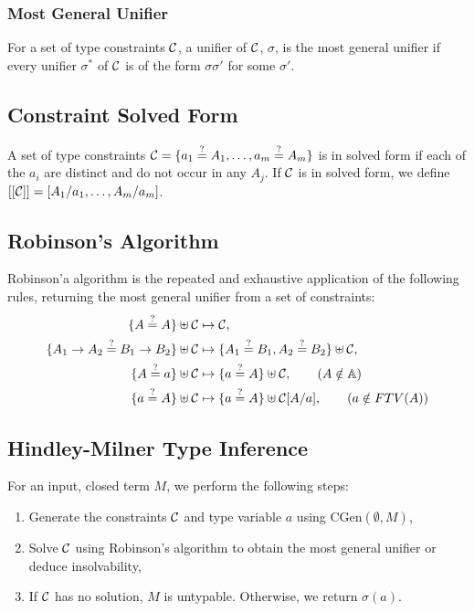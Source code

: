 \subsubsection{Most General Unifier}

For a set of type constraints $\mathcal{C}$, a unifier of $\mathcal{C}$, $\sigma$, 
is the most general unifier if every unifier $\sigma^*$ of $\mathcal{C}$ is 
of the form $\sigma\sigma'$ for some $\sigma'$.

\subsection{Constraint Solved Form}

A set of type constraints $\mc{C} = \{a_1 \teq A_1, \ldots, a_m \teq A_m\}$
is in solved form if each of the $a_i$ are distinct and do not occur
in any $A_j$. If $\mathcal{C}$ is in solved form, we define 
$[[\mathcal{C}]] = [A_1/a_1, \ldots, A_m/a_m]$.

\subsection{Robinson's Algorithm}

Robinson'a algorithm is the repeated and exhaustive application of the 
following rules, returning the most general unifier from
a set of constraints: \begin{align*}
    \{A \teq A\} \uplus \mc{C} 
    &\mapsto \mc{C}, 
    \\
    \{A_1 \to A_2 \teq B_1 \to B_2\} \uplus \mc{C} 
    &\mapsto \{A_1 \teq B_1, A_2 \teq B_2\} \uplus \mc{C}, 
    \\
    \{A \teq a\} \uplus \mc{C} 
    &\mapsto \{a \teq A\} \uplus \mc{C}, \tag{$A \notin \mb{A}$} 
    \\
    \{a \teq A\} \uplus \mc{C} 
    &\mapsto \{a \teq A\} \uplus \mc{C}[A / a], \tag{$a \notin FTV(A)$} 
\end{align*}

\subsection{Hindley-Milner Type Inference}

For an input, closed term $M$, we perform the following steps: \begin{enumerate}
    \item Generate the constraints $\mathcal{C}$ and type variable $a$ using
        CGen$(\emptyset, M)$,
    \item Solve $\mathcal{C}$ using Robinson's algorithm to obtain the most general
        unifier or deduce insolvability,
    \item If $\mathcal{C}$ has no solution, $M$ is untypable. Otherwise, we
        return $\sigma(a)$.
\end{enumerate}


